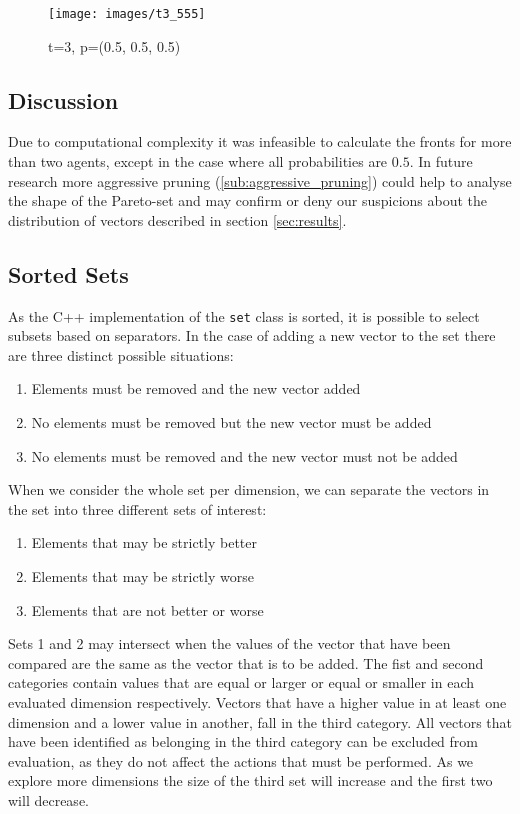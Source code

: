 \documentclass{article}
\begin{document}
	\begin{figure}
		\centering
		\texttt{[image: images/t3\_555]}
		\caption{t=3, p=(0.5, 0.5, 0.5)}
		\label{fig:t3_555}
	\end{figure}

	\newpage
	\begin{multicols}{2}
	\section{Discussion}
	\label{sec:discussion}
	Due to computational complexity it was infeasible to calculate the fronts
	for more than two agents, except in the case where all probabilities are
	$0.5$. In future research more aggressive pruning
	(\ref{sub:aggressive_pruning}) could help to analyse the shape of the
	Pareto-set and may confirm or deny our suspicions about the distribution of
	vectors described in section \ref{sec:results}.
	\subsection{Sorted Sets}
		\label{sub:sorted_sets}
		As the C++ implementation of the \texttt{set} class is sorted, it is
		possible to select subsets based on separators. In the case of adding a
		new vector to the set there are three distinct possible situations:
		\begin{enumerate}
			\item Elements must be removed and the new vector added
			\item No elements must be removed but the new vector must be added
			\item No elements must be removed and the new vector must not be added
		\end{enumerate}
		When we consider the whole set per dimension, we can separate the vectors
		in the set into three different sets of interest:
		\begin{enumerate}
			\item Elements that may be strictly better
			\item Elements that may be strictly worse
			\item Elements that are not better or worse
		\end{enumerate}
		Sets 1 and 2 may intersect when the values of the vector that have been
		compared are the same as the vector that is to be added.  The fist and
		second categories contain values that are equal or larger or equal or
		smaller in each evaluated dimension respectively. Vectors that have a
		higher value in at least one dimension and a lower value in another, fall
		in the third category. All vectors that have been identified as belonging
		in the third category can be excluded from evaluation, as they do not
		affect the actions that must be performed. As we explore more dimensions
		the size of the third set will increase and the first two will decrease.


\end{multicols}
\end{document}
